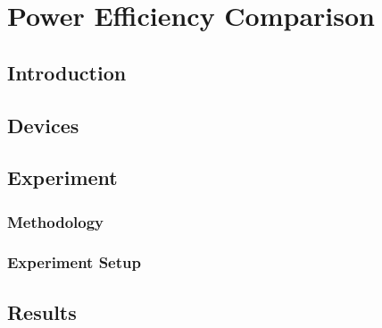
\chapter{Power Efficiency Comparison} %

\label{Chapter6} %



\section{Introduction}

\section{Devices}

\section{Experiment}

\subsection{Methodology}

\subsection{Experiment Setup}

\section{Results}
